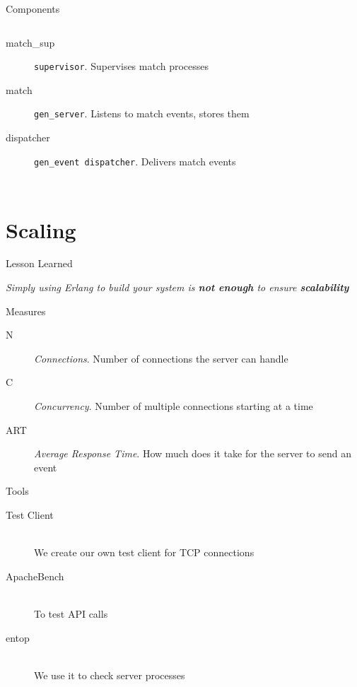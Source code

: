 \documentclass[utf8]{beamer}
\begin{document}
\begin{frame}{Components}
\begin{columns}
{\begin{description}
					\item[match\_sup]
						\texttt{supervisor}. Supervises match processes
					\item[match]
						\texttt{gen\_server}. Listens to match events, stores them
					\item[dispatcher]
						\texttt{gen\_event dispatcher}. Delivers match events
				\end{description}}
	\end{columns}
\end{frame}

\section{Scaling}
\begin{frame}{Lesson Learned}
	\begin{center}
		\huge \emph{Simply using Erlang to build your system is \textbf{not enough} to ensure \textbf{scalability}}
	\end{center}
\end{frame}

\begin{frame}{Measures}
	\begin{description}
		\item[N] \emph{Connections}. Number of connections the server can handle
		\item[C] \emph{Concurrency}. Number of multiple connections starting at a time
		\item[ART] \emph{Average Response Time}. How much does it take for the server to send an event
	\end{description}
\end{frame}
\begin{frame}{Tools}
	\begin{description}
		\item[Test Client]~\\ We create our own test client for TCP connections
		\item[ApacheBench]~\\ To test API calls
		\item[entop]~\\ We use it to check server processes
	\end{description}
\end{frame}
\end{document}
